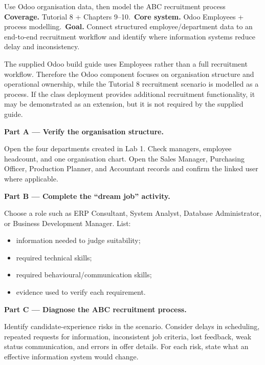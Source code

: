 
\begin{labproject}{Use Odoo organisation data, then model the ABC recruitment process}
\textbf{Coverage.} Tutorial 8 + Chapters 9--10.\
\textbf{Core system.} Odoo Employees + process modelling.\
\textbf{Goal.} Connect structured employee/department data to an end-to-end recruitment workflow and identify where information systems reduce delay and inconsistency.

\begin{labmode}
The supplied Odoo build guide uses Employees rather than a full recruitment workflow. Therefore the Odoo component focuses on organisation structure and operational ownership, while the Tutorial 8 recruitment scenario is modelled as a process. If the class deployment provides additional recruitment functionality, it may be demonstrated as an extension, but it is not required by the supplied guide.
\end{labmode}

\medskip\noindent\textbf{Part A --- Verify the organisation structure.}

Open the four departments created in Lab 1. Check managers, employee headcount, and one organisation chart. Open the Sales Manager, Purchasing Officer, Production Planner, and Accountant records and confirm the linked user where applicable.

\medskip\noindent\textbf{Part B --- Complete the ``dream job'' activity.}

Choose a role such as ERP Consultant, System Analyst, Database Administrator, or Business Development Manager. List:
\begin{itemize}
  \item information needed to judge suitability;
  \item required technical skills;
  \item required behavioural/communication skills;
  \item evidence used to verify each requirement.
\end{itemize}

\medskip\noindent\textbf{Part C --- Diagnose the ABC recruitment process.}

Identify candidate-experience risks in the scenario. Consider delays in scheduling, repeated requests for information, inconsistent job criteria, lost feedback, weak status communication, and errors in offer details. For each risk, state what an effective information system would change.


\end{labproject}
